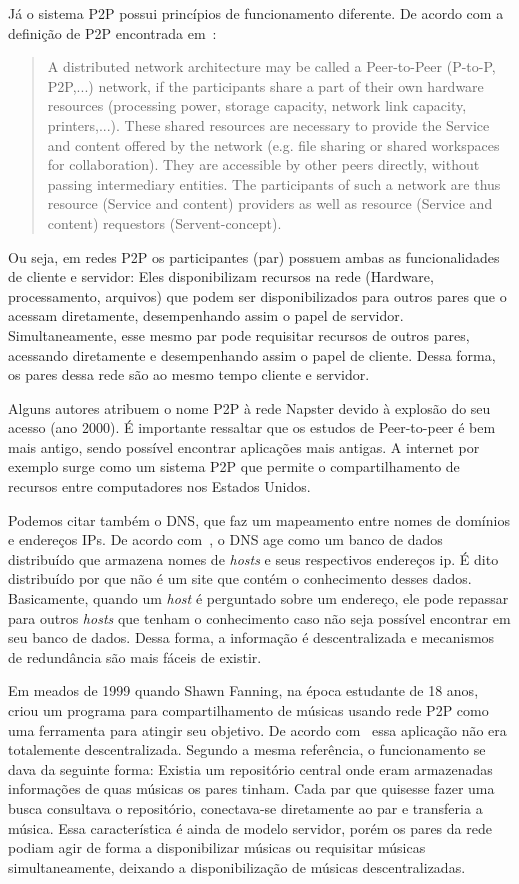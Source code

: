 Já o sistema P2P possui princípios de funcionamento diferente. De acordo com a definição de P2P encontrada em~\cite{rudiger02}:

\begin{quote}
A distributed network architecture may be called a Peer-to-Peer (P-to-P, P2P,...) network, if the participants share a part of their own hardware resources (processing power, storage capacity, network link capacity, printers,...). These shared resources are necessary to provide the Service and content offered by the network (e.g. file sharing or shared workspaces for collaboration). They are accessible by other peers directly, without passing intermediary entities. The participants of such a network are thus resource (Service and content) providers as well as resource (Service and content) requestors (Servent-concept).
\end{quote}

Ou seja, em redes P2P os participantes (par) possuem ambas as funcionalidades de cliente e servidor: Eles disponibilizam recursos na rede (Hardware, processamento, arquivos) que podem ser disponibilizados para outros pares que o acessam diretamente, desempenhando assim o papel de servidor. Simultaneamente, esse mesmo par pode requisitar recursos de outros pares, acessando diretamente e desempenhando assim o papel de cliente. Dessa forma, os pares dessa rede são ao mesmo tempo cliente e servidor.

Alguns autores atribuem	o nome P2P à rede Napster devido à explosão do seu acesso (ano 2000). É importante ressaltar que os estudos de Peer-to-peer é bem mais antigo, sendo possível encontrar aplicações mais antigas. A internet por exemplo surge como um sistema P2P que permite o compartilhamento de recursos entre computadores nos Estados Unidos.

Podemos citar também o DNS, que faz um mapeamento entre nomes de domínios e endereços IPs. De acordo com~\cite{stevens93}, o DNS age como um banco de dados distribuído que armazena nomes de \emph{hosts} e seus respectivos endereços ip. É dito distribuído por que não é um site que contém o conhecimento desses dados. Basicamente, quando um \emph{host} é perguntado sobre um endereço, ele pode repassar para outros \emph{hosts} que tenham o conhecimento caso não seja possível encontrar em seu banco de dados. Dessa forma, a informação é descentralizada e mecanismos de redundância são mais fáceis de existir.

Em meados de 1999 quando Shawn Fanning, na época estudante de 18 anos, criou um programa para compartilhamento de músicas usando rede P2P como uma ferramenta para atingir seu objetivo. De acordo com~\cite{oram01} essa aplicação não era totalemente descentralizada. Segundo a mesma referência, o funcionamento se dava da seguinte forma: Existia um repositório central onde eram armazenadas informações de quas músicas os pares tinham. Cada par que quisesse fazer uma busca consultava o repositório, conectava-se diretamente ao par e transferia a música. Essa característica é ainda de modelo servidor, porém os pares da rede podiam agir de forma a disponibilizar músicas ou requisitar músicas simultaneamente, deixando a disponibilização de músicas descentralizadas.

